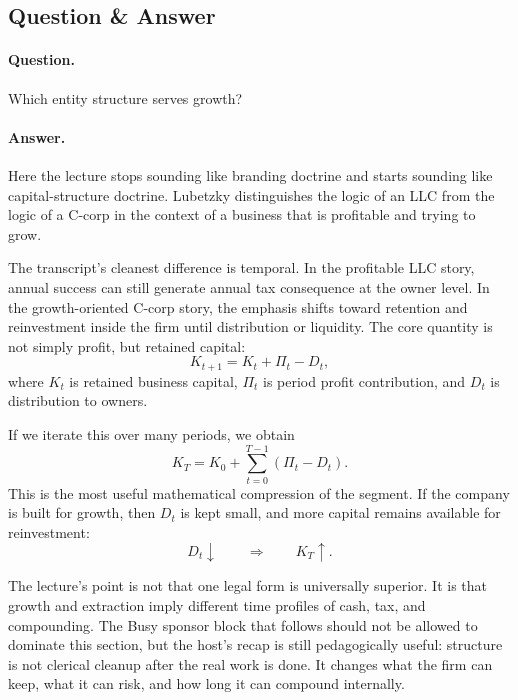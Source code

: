 \subsection{Question \& Answer}

\paragraph{Question.} Which entity structure serves growth?

\paragraph{Answer.} Here the lecture stops sounding like branding doctrine and starts sounding like capital-structure doctrine. Lubetzky distinguishes the logic of an LLC from the logic of a C-corp in the context of a business that is profitable and trying to grow.

The transcript's cleanest difference is temporal. In the profitable LLC story, annual success can still generate annual tax consequence at the owner level. In the growth-oriented C-corp story, the emphasis shifts toward retention and reinvestment inside the firm until distribution or liquidity. The core quantity is not simply profit, but retained capital:
\begin{equation}
K_{t+1}=K_t+\Pi_t-D_t,
\end{equation}
where \(K_t\) is retained business capital, \(\Pi_t\) is period profit contribution, and \(D_t\) is distribution to owners.

If we iterate this over many periods, we obtain
\begin{equation}
K_T = K_0 + \sum_{t=0}^{T-1}(\Pi_t-D_t).
\end{equation}
This is the most useful mathematical compression of the segment. If the company is built for growth, then \(D_t\) is kept small, and more capital remains available for reinvestment:
\begin{equation}
D_t \downarrow \qquad \Longrightarrow \qquad K_T \uparrow.
\end{equation}

The lecture's point is not that one legal form is universally superior. It is that growth and extraction imply different time profiles of cash, tax, and compounding. The Busy sponsor block that follows should not be allowed to dominate this section, but the host's recap is still pedagogically useful: structure is not clerical cleanup after the real work is done. It changes what the firm can keep, what it can risk, and how long it can compound internally.

